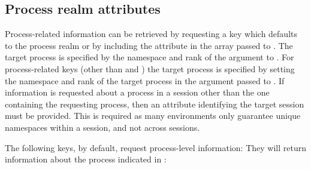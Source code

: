 \subsection{Process realm attributes}
\label{chap:api_rsvd_keys:prealm}


Process-related information can be retrieved by requesting a key which defaults
to the process realm or by including the  attribute
in the  array passed to .
The target process is specified by the namespace
and rank of the  argument to . 
For process-related keys (other than  and ) 
the target process is specified by setting the namespace and rank
of the target process in the  argument passed to .
If information
is requested about a process in a session other than the one containing the
requesting process, then an attribute identifying the target session must be
provided. This is required as many environments only guarantee unique
namespaces within a session, and not across sessions.

The following keys, by default, request process-level information:
They will return information about the process indicated in :

%
%



